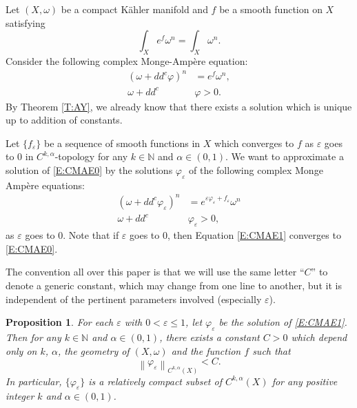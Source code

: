 \documentclass{amsart}
\newtheorem{proposition}[theorem]{Proposition}
\theoremstyle{definition}
\numberwithin{equation}{section}
\begin{document}
Let $(X,\omega)$ be a compact K\"ahler manifold and $f$ be a smooth function on $X$ satisfying
\begin{equation*}
\int_X e^f\omega^n=\int_X\omega^n.
\end{equation*}
Consider the following complex Monge-Amp\`ere equation:
\begin{equation} \label{E:CMAE0}
\begin{aligned}
{\left({\omega+dd^c\varphi}\right)}^n &= e^f\omega^n, \\
\omega+dd^c&\varphi>0.
\end{aligned}
\end{equation}
By Theorem \ref{T:AY}, we already know that there exists a solution which is unique up to addition of constants. 

Let $\{f_{\varepsilon}\}$ be a sequence of smooth functions in $X$ which converges to $f$ as ${\varepsilon}$ goes to $0$ in $C^{k,\alpha}$-topology for any $k\in{\mathbb{N}}$ and $\alpha\in(0,1)$. We want to approximate a solution of \eqref{E:CMAE0} by the solutions ${\varphi}_{\varepsilon}$ of the following complex Monge Amp\`ere equations:
\begin{equation} \label{E:CMAE1}
\begin{aligned}
{\left({\omega+dd^c{\varphi}_{\varepsilon}}\right)}^n &= 
e^{{\varepsilon}{\varphi}_{\varepsilon}+f_{\varepsilon}}\omega^n \\
\omega+dd^c&{\varphi}_{\varepsilon}>0,
\end{aligned}
\end{equation}
as ${\varepsilon}$ goes to $0$.  Note that if ${\varepsilon}$ goes to $0$, then Equation \eqref{E:CMAE1} converges to \eqref{E:CMAE0}. 

The convention all over this paper is that we will use the same letter ``$C$'' to denote a generic constant, which may change from one line to another, but it is independent of the pertinent parameters involved (especially ${\varepsilon}$).

\begin{proposition} \label{P:approximation1}
For each ${\varepsilon}$ with $0<{\varepsilon}\le1$, let ${\varphi}_{\varepsilon}$ be the solution of \eqref{E:CMAE1}. Then for any $k\in{\mathbb{N}}$ and $\alpha\in(0,1)$, there exists a constant $C>0$ which depend only on $k$, $\alpha$, the geometry of $(X,\omega)$ and the function $f$ such that 
\begin{equation*}
{\left\|{{\varphi}_{\varepsilon}}\right\|}_{C^{k,\alpha}(X)}<C.
\end{equation*}
In particular, $\{{\varphi}_{\varepsilon}\}$ is a relatively compact subset of $C^{k,\alpha}(X)$ for any positive integer $k$ and $\alpha\in(0,1)$.
\end{proposition}
\end{document}
